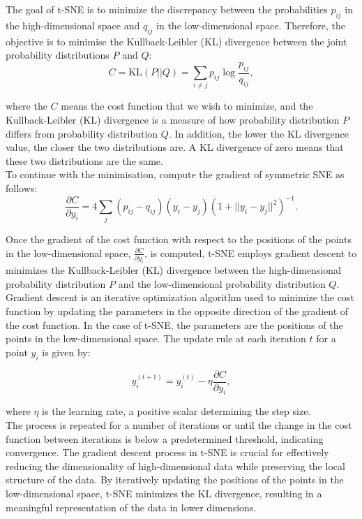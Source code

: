 \documentclass{article}\usepackage[]{graphicx}\usepackage[]{xcolor}
\numberwithin{equation}{section}
\begin{document}
\noindent
The goal of t-SNE is to minimize the discrepancy between the probabilities 
$p_ {ij}$ in the high-dimensional space and $q_{ij}$ in the low-dimensional space. Therefore, the objective is to minimise the Kullback-Leibler (KL) divergence\cite{vanderMaaten2008tsne} between the joint probability distributions $P$ and $Q$:
    \[
        C = \text{KL}(P || Q) = \sum_{i \neq j} p_{ij} \log \frac{p_{ij}}{q_{ij}},
    \]
    
\noindent
where the $C$ means the cost function that we wish to minimize, and the Kullback-Leibler (KL) divergence is a measure of how probability distribution $P$ differs from probability distribution $Q$. In addition, the lower the KL divergence value, the closer the two distributions are. A KL divergence of zero means that these two distributions are the same.\\

\noindent
To continue with the minimisation, compute the gradient of symmetric SNE\cite{vanderMaaten2008tsne} as follows:
\[\frac{\partial C}{\partial y_i} = 4 \sum_j (p_{ij} - q_{ij})(y_i - y_j)(1 + ||y_i - y_j||^2)^{-1}
.\]

\noindent
Once the gradient of the cost function with respect to the positions of the points in the low-dimensional space, $\frac{\partial C}{\partial y_i}$, is computed, t-SNE employs gradient descent to minimizes the Kullback-Leibler (KL) divergence between the high-dimensional probability distribution $P$ and the low-dimensional probability distribution $Q$. Gradient descent is an iterative optimization algorithm used to minimize the cost function by updating the parameters in the opposite direction of the gradient of the cost function. In the case of t-SNE, the parameters are the positions of the points in the low-dimensional space. The update rule\cite{vanderMaaten2008tsne} at each iteration $t$ for a point $y_i$ is given by:

\[y_i^{(t+1)} = y_i^{(t)} - \eta \frac{\partial C}{\partial y_i},\]

\noindent
where $\eta$ is the learning rate, a positive scalar determining the step size.\\

\noindent
The process is repeated for a number of iterations or until the change in the cost function between iterations is below a predetermined threshold, indicating convergence. The gradient descent process in t-SNE is crucial for effectively reducing the dimensionality of high-dimensional data while preserving the local structure of the data. By iteratively updating the positions of the points in the low-dimensional space, t-SNE minimizes the KL divergence, resulting in a meaningful representation of the data in lower dimensions.
\end{document}
